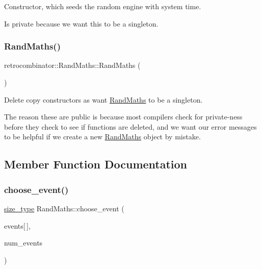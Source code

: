 Constructor, which seeds the random engine with system time. 

Is private because we want this to be a singleton. \mbox{\label{classretrocombinator_1_1RandMaths_aca899b8322519172fe008e0697c432db}} 
\subsubsection{\texorpdfstring{Rand\+Maths()}{RandMaths()}\hspace{0.1cm}{\footnotesize\ttfamily [2/2]}}
{\footnotesize\ttfamily retrocombinator\+::\+Rand\+Maths\+::\+Rand\+Maths (\begin{DoxyParamCaption}\item[{\hyperlink{classretrocombinator_1_1RandMaths}{Rand\+Maths} const \&}]{ }\end{DoxyParamCaption})\hspace{0.3cm}{\ttfamily [delete]}}



Delete copy constructors as want \hyperlink{classretrocombinator_1_1RandMaths}{Rand\+Maths} to be a singleton. 

The reason these are public is because most compilers check for private-\/ness before they check to see if functions are deleted, and we want our error messages to be helpful if we create a new \hyperlink{classretrocombinator_1_1RandMaths}{Rand\+Maths} object by mistake. 

\subsection{Member Function Documentation}
\mbox{\label{classretrocombinator_1_1RandMaths_a3834f9a074546f0d588247610f16fb0e}} 
\subsubsection{\texorpdfstring{choose\+\_\+event()}{choose\_event()}}
{\footnotesize\ttfamily \hyperlink{namespaceretrocombinator_a8e1541b50cee66a791df4c437ccbb385}{size\+\_\+type} Rand\+Maths\+::choose\+\_\+event (\begin{DoxyParamCaption}\item[{const double}]{events\mbox{[}$\,$\mbox{]},  }\item[{\hyperlink{namespaceretrocombinator_a8e1541b50cee66a791df4c437ccbb385}{size\+\_\+type}}]{num\+\_\+events }\end{DoxyParamCaption})}



